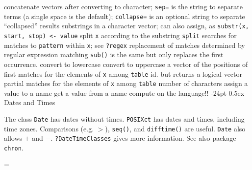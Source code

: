 \documentclass[10pt,landscape]{article}
\makeatletter
\renewcommand\section{\@startsection{section}{1}{0mm}%
                                     {-24pt}%
                                     {0.5ex}%
                                {\color{blue}\normalfont\large\bfseries}}
\newcommand{\code}{\texttt}
\makeatother
\begin{document}
\begin{multicols*}{3}
 concatenate vectors after converting to character; \code{sep=} is the string to separate terms (a single space is the default); \code{collapse=}	{is an optional string to separate ``collapsed'' results}
	{substrings in a character vector; can also assign, as \code{substr(x, start, stop) <- value}}
 split \code{x}	{according to the substring \code{split}}
 searches for matches to \code{pattern}	{within \code{x}; see \code{?regex}}
 replacement of matches determined by regular expression matching \code{sub()}	{is the same but only replaces the first occurrence.}
	{convert to lowercase}
	{convert to uppercase}
 a vector of the positions of first matches for the elements of \code{x}	{among \code{table}}
	{id. but returns a logical vector}
 partial matches for the elements of \code{x}	{among \code{table}}
	{number of characters}
	{assign a value to a name}
	{get a value from a name}
	{compute on the language!!}
\section{\color{blue}Dates and Times}

The class \code{Date} has dates without times.  \code{POSIXct} has
dates and times, including time zones. Comparisons (e.g. $>$),
\code{seq()}, and \code{difftime()} are useful. \code{Date} also allows
$+$ and $-$. \code{?DateTimeClasses} gives more information. See also package
\code{chron}.

\everypar={\hangindent=9mm}


\end{multicols*}
\end{document}
